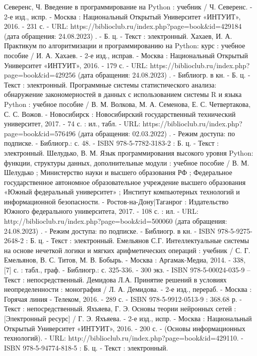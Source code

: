\begin{thebibliography}{50}
     Северенс, Ч.   Введение в программирование на Python : учебник / Ч. Северенс. - 2-е изд., испр. - Москва : Национальный Открытый Университет «ИНТУИТ», 2016. - 231 с. - URL: https://biblioclub.ru/index.php?page=book\&id=429184 (дата обращения: 24.08.2023) . - Б. ц. - Текст : электронный.
     Хахаев, И. А.   Практикум по алгоритмизации и программированию на Python: курс : учебное пособие / И. А. Хахаев. - 2-е изд., исправ. - Москва : Национальный Открытый Университет «ИНТУИТ», 2016. - 179 с. - URL: https://biblioclub.ru/index.php?page=book\&id=429256 (дата обращения: 24.08.2023) . - Библиогр. в кн. - Б. ц. - Текст : электронный.
     Программные системы статистического анализа: обнаружение закономерностей в данных с использованием системы R и языка Python : учебное пособие / В. М. Волкова, М. А. Семенова, Е. С. Четвертакова, С. С. Вожов. - Новосибирск : Новосибирский государственный технический университет, 2017. - 74 с. : ил., табл. - URL: https://biblioclub.ru/index.php?page=book\&id=576496 (дата обращения: 02.03.2022) . - Режим доступа: по подписке. - Библиогр.: с. 48. - ISBN 978-5-7782-3183-2 : Б. ц. - Текст : электронный.
     Шелудько, В. М.  Язык программирования высокого уровня Python: функции, структуры данных, дополнительные модули : учебное пособие / В. М. Шелудько ; Министерство науки и высшего образования РФ ; Федеральное государственное автономное образовательное учреждение высшего образования «Южный федеральный университет» ; Институт компьютерных технологий и информационной безопасности. - Ростов-на-Дону|Таганрог : Издательство Южного федерального университета, 2017. - 108 с. : ил. - URL: http://biblioclub.ru/index.php?page=book\&id=500060 (дата обращения: 24.08.2023) . - Режим доступа: по подписке. - Библиогр. в кн. - ISBN 978-5-9275-2648-2 : Б. ц. - Текст : электронный.
     Емельянов С.Г.   Интеллектуальные системы на основе нечеткой логики и мягких арифметических операций : учебник / С. Г. Емельянов, В. С. Титов, М. В. Бобырь. - Москва : Аргамак-Медиа, 2014. - 338, [7] с. : табл., граф. - Библиогр.: с. 325-336. - 300 экз. - ISBN 978-5-00024-035-9 –  Текст : непосредственный.
     Демидова Л.А.  Принятие решений в условиях неопределенности : монография / Л. А. Демидова. - 2-е изд., перераб. - Москва : Горячая линия - Телеком, 2016. - 289 с. - ISBN 978-5-9912-0513-9 : 368.68 р. - Текст : непосредственный.
     Яхъяева, Г. Э.   Основы теории нейронных сетей : [Электронный ресурс] / Г. Э. Яхъяева. - 2-е изд., испр. - Москва : Национальный Открытый Университет «ИНТУИТ», 2016. - 200 с. - (Основы информационных технологий). - URL: http://biblioclub.ru/index.php?page=book\&id=429110. - ISBN 978-5-94774-818-5 : Б. ц. - Текст : электронный.

\end{thebibliography}
